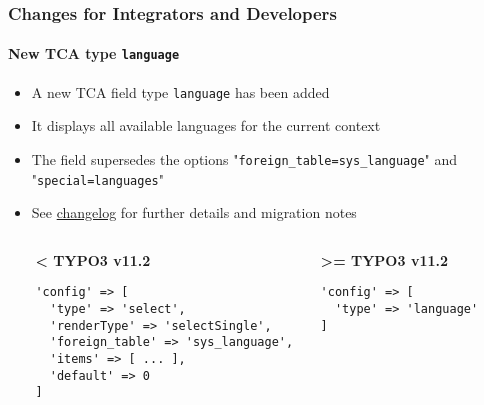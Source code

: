%

\begin{frame}[fragile]
	\frametitle{Changes for Integrators and Developers}
	\framesubtitle{New TCA type \texttt{language}}


	\begin{itemize}
		\item A new TCA field type \texttt{language} has been added
		\item It displays all available languages for the current context
		\item The field supersedes the options\newline
			"\texttt{foreign\_table=sys\_language}"
			and
			"\texttt{special=languages}"
		\item See
			\href{https://docs.typo3.org/c/typo3/cms-core/master/en-us/Changelog/master/Feature-57082-NewTCATypeLanguage.html}{changelog}
			for further details and migration notes
	\end{itemize}


	\vspace{0.2cm}
	\begin{columns}[T]
			\begin{column}{.1\textwidth}
			\end{column}
			\begin{column}{.4\textwidth}
			\smaller\textbf{< TYPO3 v11.2}\normalsize
\begin{lstlisting}
'config' => [
  'type' => 'select',
  'renderType' => 'selectSingle',
  'foreign_table' => 'sys_language',
  'items' => [ ... ],
  'default' => 0
]
\end{lstlisting}
			\end{column}
			\begin{column}{.4\textwidth}
			\smaller\textbf{>= TYPO3 v11.2}\normalsize
\begin{lstlisting}
'config' => [
  'type' => 'language'
]
\end{lstlisting}
			\end{column}
			\begin{column}{.1\textwidth}
			\end{column}
	\end{columns}

\end{frame}

